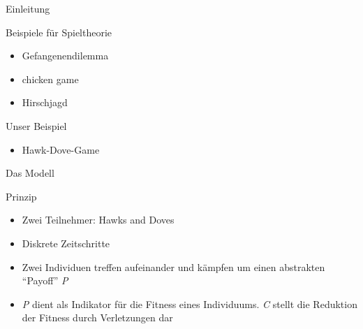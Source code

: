 \documentclass{beamer}
\begin{document}
\begin{frame}{Einleitung}
    \begin{block}{Beispiele für Spieltheorie}
    \begin{itemize}
        \item Gefangenendilemma
        \item chicken game	
        \item Hirschjagd
    \end{itemize}
    \end{block} \pause
    \begin{alertblock}{Unser Beispiel}
    \begin{itemize}
        \item Hawk-Dove-Game
    \end{itemize}
    \end{alertblock}
\end{frame}



\begin{frame}{Das Modell}
    \begin{block}{Prinzip}
    \begin{itemize}
	 \item Zwei Teilnehmer: Hawks and Doves
	 \item Diskrete Zeitschritte
	 \item Zwei Individuen treffen aufeinander und kämpfen um einen abstrakten ``Payoff'' \textit{P}
	 \item \textit{P} dient als Indikator für die Fitness eines Individuums. \textit{C} stellt die Reduktion der Fitness durch Verletzungen dar
    \end{itemize}
    \end{block}
\end{frame}
\end{document}
